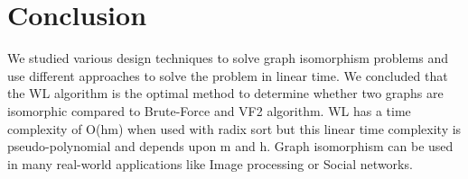 \documentclass[11pt]{article}
\begin{document}
\section{Conclusion}
We studied various design techniques to solve graph isomorphism problems and use different approaches to solve the problem in linear time. We concluded that the WL algorithm is the optimal method to determine whether two graphs are isomorphic compared to Brute-Force and VF2 algorithm. WL has a time complexity of O(hm) when used with radix sort but this linear time complexity is pseudo-polynomial and depends upon m and h. Graph isomorphism can be used in many real-world applications like Image processing or Social networks.
\label{sec:length}




\end{document}
